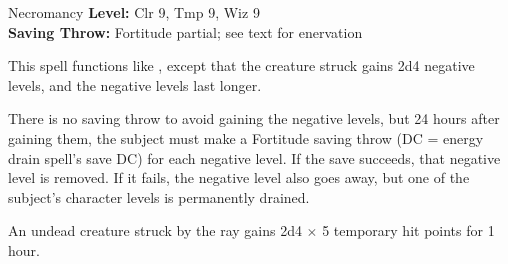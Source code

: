 {Necromancy}
{
	\textbf{Level:}
	Clr 9, Tmp 9, Wiz 9\\
	\textbf{Saving Throw:}
	Fortitude partial; see text for enervation\\
}
{
	This spell functions like , except that the creature struck gains 2d4 negative levels, and the negative levels last longer.

	There is no saving throw to avoid gaining the negative levels, but 24 hours after gaining them, the subject must make a Fortitude saving throw (DC = energy drain spell's save DC) for each negative level. If the save succeeds, that negative level is removed. If it fails, the negative level also goes away, but one of the subject's character levels is permanently drained.

	An undead creature struck by the ray gains 2d4 $\times$ 5 temporary hit points for 1 hour.

}
